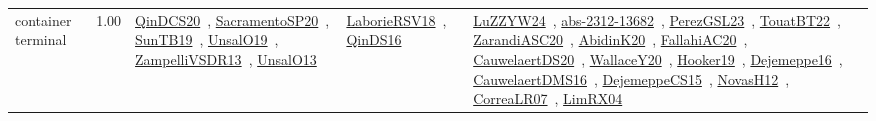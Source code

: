 {\begin{longtable}{p{3cm}r>{\raggedright\arraybackslash}p{6cm}>{\raggedright\arraybackslash}p{6cm}>{\raggedright\arraybackslash}p{8cm}}
\index{container terminal}\index{ApplicationAreas!container terminal}container terminal &  1.00 & \href{../works/QinDCS20.pdf}{QinDCS20}~\cite{QinDCS20}, \href{../works/SacramentoSP20.pdf}{SacramentoSP20}~\cite{SacramentoSP20}, \href{../works/SunTB19.pdf}{SunTB19}~\cite{SunTB19}, \href{../works/UnsalO19.pdf}{UnsalO19}~\cite{UnsalO19}, \href{../works/ZampelliVSDR13.pdf}{ZampelliVSDR13}~\cite{ZampelliVSDR13}, \href{../works/UnsalO13.pdf}{UnsalO13}~\cite{UnsalO13} & \href{../works/LaborieRSV18.pdf}{LaborieRSV18}~\cite{LaborieRSV18}, \href{../works/QinDS16.pdf}{QinDS16}~\cite{QinDS16} & \href{../works/LuZZYW24.pdf}{LuZZYW24}~\cite{LuZZYW24}, \href{../works/abs-2312-13682.pdf}{abs-2312-13682}~\cite{abs-2312-13682}, \href{../works/PerezGSL23.pdf}{PerezGSL23}~\cite{PerezGSL23}, \href{../works/TouatBT22.pdf}{TouatBT22}~\cite{TouatBT22}, \href{../works/ZarandiASC20.pdf}{ZarandiASC20}~\cite{ZarandiASC20}, \href{../works/AbidinK20.pdf}{AbidinK20}~\cite{AbidinK20}, \href{../works/FallahiAC20.pdf}{FallahiAC20}~\cite{FallahiAC20}, \href{../works/CauwelaertDS20.pdf}{CauwelaertDS20}~\cite{CauwelaertDS20}, \href{../works/WallaceY20.pdf}{WallaceY20}~\cite{WallaceY20}, \href{../works/Hooker19.pdf}{Hooker19}~\cite{Hooker19}, \href{../works/Dejemeppe16.pdf}{Dejemeppe16}~\cite{Dejemeppe16}, \href{../works/CauwelaertDMS16.pdf}{CauwelaertDMS16}~\cite{CauwelaertDMS16}, \href{../works/DejemeppeCS15.pdf}{DejemeppeCS15}~\cite{DejemeppeCS15}, \href{../works/NovasH12.pdf}{NovasH12}~\cite{NovasH12}, \href{../works/CorreaLR07.pdf}{CorreaLR07}~\cite{CorreaLR07}, \href{../works/LimRX04.pdf}{LimRX04}~\cite{LimRX04}\\

\end{longtable}}
